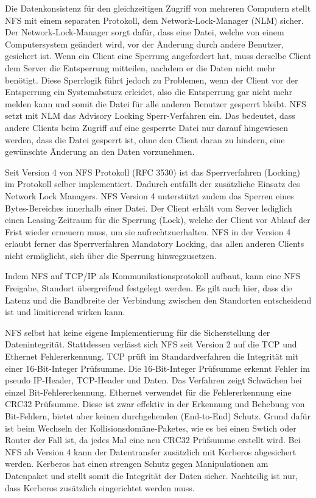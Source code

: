 Die Datenkonsistenz für den gleichzeitigen Zugriff von mehreren Computern stellt NFS mit einem separaten Protokoll, dem Network-Lock-Manager (NLM) sicher. Der Network-Lock-Manager sorgt dafür, dass eine Datei, welche von einem Computersystem geändert wird, vor der Änderung durch andere Benutzer, gesichert ist. Wenn ein Client eine Sperrung angefordert hat, muss derselbe Client dem Server die Entsperrung mitteilen, nachdem er die Daten nicht mehr benötigt. Diese Sperrlogik führt jedoch zu Problemen, wenn der Client vor der Entsperrung ein Systemabsturz erleidet, also die Entsperrung gar nicht mehr melden kann und somit die Datei für alle anderen Benutzer gesperrt bleibt.
NFS setzt mit NLM das Advisory Locking Sperr-Verfahren ein. Das bedeutet, dass andere Clients beim Zugriff auf eine gesperrte Datei nur darauf hingewiesen werden, dass die Datei gesperrt ist, ohne den Client daran zu hindern, eine gewünschte Änderung an den Daten vorzunehmen. \cite{Stern2001}

Seit Version 4 von NFS Protokoll (\gls{RFC} 3530) ist das Sperrverfahren (Locking) im Protokoll selber implementiert. Dadurch entfällt der zusätzliche Einsatz des Network Lock Managers. NFS Version 4 unterstützt zudem das Sperren eines Bytes-Bereiches innerhalb einer Datei. Der Client erhält vom Server lediglich einen Leasing-Zeitraum für die Sperrung (Lock), welche der Client vor Ablauf der Frist wieder erneuern muss, um sie aufrechtzuerhalten. NFS in der Version 4 erlaubt ferner das Sperrverfahren Mandatory Locking, das allen anderen Clients nicht ermöglicht, sich über die Sperrung hinwegzusetzen. \cite{Callaghan2003}

Indem NFS auf TCP/IP als Kommunikationsprotokoll aufbaut, kann eine NFS Freigabe, Standort übergreifend festgelegt werden. Es gilt auch hier, dass die Latenz und die Bandbreite der Verbindung zwischen den Standorten entscheidend ist und limitierend wirken kann.

NFS selbst hat keine eigene Implementierung für die Sicherstellung der Datenintegrität. Stattdessen verlässt sich NFS seit Version 2 auf die TCP und Ethernet Fehlererkennung. TCP prüft im Standardverfahren die Integrität mit einer 16-Bit-Integer Prüfsumme. Die 16-Bit-Integer Prüfsumme erkennt Fehler im pseudo IP-Header, TCP-Header und Daten. Das Verfahren zeigt Schwächen bei einzel Bit-Fehlererkennung. Ethernet verwendet für die Fehlererkennung eine CRC32 Prüfsumme. Diese ist zwar effektiv in der Erkennung und Behebung von Bit-Fehlern, bietet aber keinen durchgehenden (End-to-End) Schutz. Grund dafür ist beim Wechseln der Kollisionsdomäne-Paketes, wie es bei einen Swtich oder Router der Fall ist, da jedes Mal eine neu CRC32 Prüfsumme erstellt wird. Bei NFS ab Version 4 kann der Datentransfer zusätzlich mit Kerberos abgesichert werden. Kerberos hat einen strengen Schutz gegen Manipulationen am Datenpaket und stellt somit die Integrität der Daten sicher. Nachteilig ist nur, dass Kerberos zusätzlich eingerichtet werden muss. \cite{JohnL.202}

